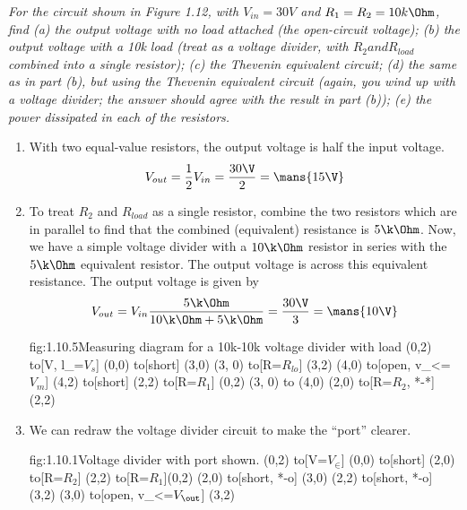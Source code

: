\documentclass{article}
\begin{document}
    \textit{For the circuit shown in Figure 1.12, with $V_{in} = 30V$ and $R_{1} = R_{2} = 10k \Ohm$, find (a) the output voltage with no load attached (the open-circuit voltage); (b) the output voltage with a 10k load (treat as a voltage divider, with $R_{2} and R_{load}$ combined into a single resistor); (c) the Thevenin equivalent circuit; (d) the same as in part (b), but using the Thevenin equivalent circuit (again, you wind up with a voltage divider; the answer should agree with the result in part (b)); (e) the power dissipated in each of the resistors.}

    \begin{enumerate}
        \item 
        With two equal-value resistors, the output voltage is half the input voltage.
        \[V_{out} = \frac{1}{2}V_{in} = \frac{30\V}{2} = \mans{15\V}\]

        \item 
        To treat $R_2$ and $R_{load}$ as a single resistor, combine the two resistors which are in parallel to find that the combined (equivalent) resistance is $5\k\Ohm$. Now, we have a simple voltage divider with a $10\k\Ohm$ resistor in series with the $5\k\Ohm$ equivalent resistor. The output voltage is across this equivalent resistance. The output voltage is given by 
        \[V_{out} = V_{in} \frac{5\k\Ohm}{10\k\Ohm + 5\k\Ohm} = \frac{30\V}{3} = \mans{10\V} \]
        
        \begin{circuit}{fig:1.10.5}{Measuring diagram for a 10k-10k voltage divider with load}
                (0,2) to[V, l_=$V_{s}$] (0,0)
                to[short] (3,0)
                (3, 0) to[R=$R_{lo}$] (3,2)
                (4,0) to[open, v_<=$V_{m}$] (4,2)
                to[short] (2,2)
                to[R=$R_1$] (0,2)
                (3, 0) to (4,0)
                (2,0) to[R=$R_2$, *-*] (2,2)
        \end{circuit}

        \item 
        We can redraw the voltage divider circuit to make the ``port'' clearer. 
        \begin{circuit}{fig:1.10.1}{Voltage divider with port shown.}
            (0,2) to[V=$V_{\in}$] (0,0)
            to[short] (2,0)
            to[R=$R_2$] (2,2)
            to[R=$R_1$](0,2)
            (2,0) to[short, *-o] (3,0)
            (2,2) to[short, *-o] (3,2)
            (3,0) to[open, v_<=$V_\out$] (3,2)
        \end{circuit}


\end{enumerate}
\end{document}
